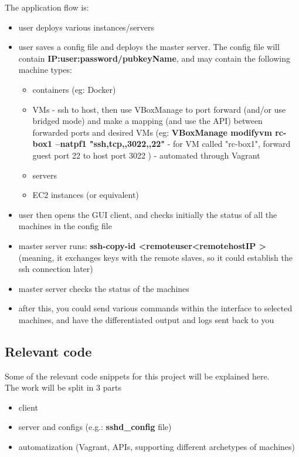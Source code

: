 \documentclass{llncs}
\begin{document}
The application flow is:
\begin{itemize}
  \item user deploys various instances/servers
  \item user saves a config file and deploys the master server. The config file will contain \textbf{IP:user:password/pubkeyName}, and may contain the following machine types:
  \begin{itemize}
  	\item containers (eg: Docker)
    \item VMs - ssh to host, then use VBoxManage to port forward (and/or use bridged mode) and make a mapping (and use the API) between forwarded ports and desired VMs (eg: \textbf{VBoxManage modifyvm rc-box1 --natpf1 "ssh,tcp,,3022,,22"} - for VM called "rc-box1", forward guest port 22 to host port 3022 ) - automated through Vagrant
    \item servers
    \item EC2 instances (or equivalent)
  \end{itemize}
  \item user then opens the GUI client, and checks initially the status of all the machines in the config file
  \item master server runs: \textbf{ssh-copy-id \textless remoteuser\textgreater@\textless remotehostIP \textgreater} (meaning, it exchanges keys with the remote slaves, so it could establish the ssh connection later)
  \item master server checks the status of the machines
  \item after this, you could send various commands within the interface to selected machines, and have the differentiated output and logs sent back to you
\end{itemize}

\fi %

\subsection{Relevant code}

\iffalse %

Some of the relevant code snippets for this project will be explained here.\\

The work will be split in 3 parts
\begin{itemize}
	\item client
    \item server and configs (e.g.: \textbf{sshd\_config} file)
    \item automatization (Vagrant, APIs, supporting different archetypes of machines)
\end{itemize}
\end{document}
